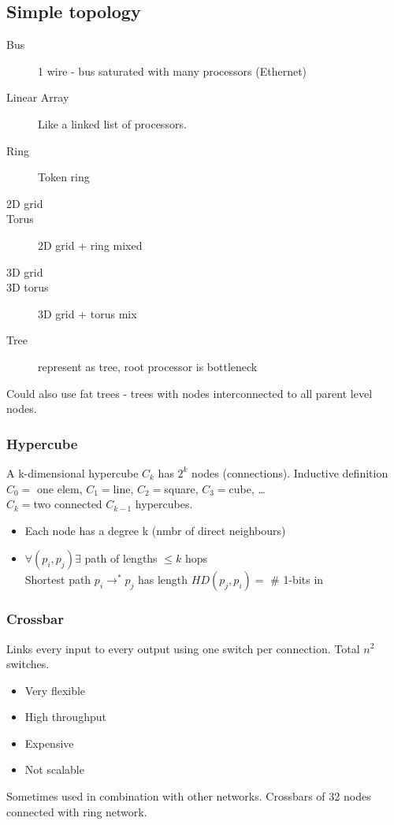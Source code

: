 \documentclass[a4paper]{article}
\begin{document}
\subsection{Simple topology}
\begin{description}
    \item[Bus] 1 wire - bus saturated with many processors (Ethernet)
    \item[Linear Array] Like a linked list of processors.
    \item[Ring] Token ring
    \item[2D grid]
    \item[Torus] 2D grid + ring mixed
    \item[3D grid]
    \item[3D torus] 3D grid + torus mix
    \item[Tree] represent as tree, root processor is bottleneck
\end{description}
Could also use fat trees - trees with nodes interconnected to all parent level nodes.

\subsubsection{Hypercube}
A k-dimensional hypercube $C_k$ has $2^k$ nodes (connections). 
Inductive definition $C_0=$ one elem, $C_1=$line, $C_2=$square, $C_3=$cube, \ldots\\
$C_k=$two connected $C_{k-1}$ hypercubes.
\begin{itemize}
    \item Each node has a degree k (nmbr of direct neighbours)
    \item $\forall (p_i,p_j) \exists$ path of lengths $\leq k$ hops\\
        Shortest path $p_i \rightarrow^* p_j$ has length $HD(p_j,p_i)=$ \# 1-bits in 
\end{itemize}
\subsubsection{Crossbar}
Links every input to every output using one switch per connection. Total $n^2$ switches.

\begin{itemize}
    \item Very flexible
    \item High throughput
    \item Expensive
    \item Not scalable
\end{itemize}
Sometimes used in combination with other networks. Crossbars of 32 nodes connected
 with ring network.
\end{document}
